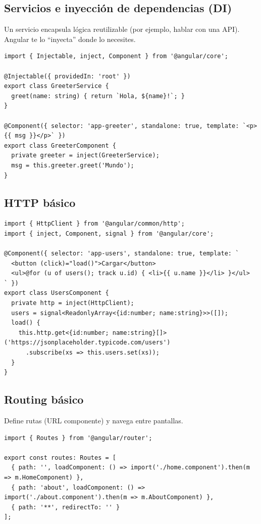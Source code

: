 \documentclass[11pt,a4paper]{article}
\begin{document}
\subsection{Servicios e inyección de dependencias (DI)}
Un servicio encapsula lógica reutilizable (por ejemplo, hablar con una API). Angular te lo “inyecta” donde lo necesites.
\begin{lstlisting}[style=tsstyle, caption={Servicio sencillo e inyección con inject()}]
import { Injectable, inject, Component } from '@angular/core';

@Injectable({ providedIn: 'root' })
export class GreeterService {
  greet(name: string) { return `Hola, ${name}!`; }
}

@Component({ selector: 'app-greeter', standalone: true, template: `<p>{{ msg }}</p>` })
export class GreeterComponent {
  private greeter = inject(GreeterService);
  msg = this.greeter.greet('Mundo');
}
\end{lstlisting}

\subsection{HTTP básico}
\begin{lstlisting}[style=tsstyle, caption={Pedir datos con HttpClient (GET)}]
import { HttpClient } from '@angular/common/http';
import { inject, Component, signal } from '@angular/core';

@Component({ selector: 'app-users', standalone: true, template: `
  <button (click)="load()">Cargar</button>
  <ul>@for (u of users(); track u.id) { <li>{{ u.name }}</li> }</ul>
` })
export class UsersComponent {
  private http = inject(HttpClient);
  users = signal<ReadonlyArray<{id:number; name:string}>>([]);
  load() {
    this.http.get<{id:number; name:string}[]>('https://jsonplaceholder.typicode.com/users')
      .subscribe(xs => this.users.set(xs));
  }
}
\end{lstlisting}

\subsection{Routing básico}
Define rutas (URL \textrightarrow{} componente) y navega entre pantallas.
\begin{lstlisting}[style=tsstyle, caption={Rutas mínimas con loadComponent}]
import { Routes } from '@angular/router';

export const routes: Routes = [
  { path: '', loadComponent: () => import('./home.component').then(m => m.HomeComponent) },
  { path: 'about', loadComponent: () => import('./about.component').then(m => m.AboutComponent) },
  { path: '**', redirectTo: '' }
];
\end{lstlisting}
\end{document}

